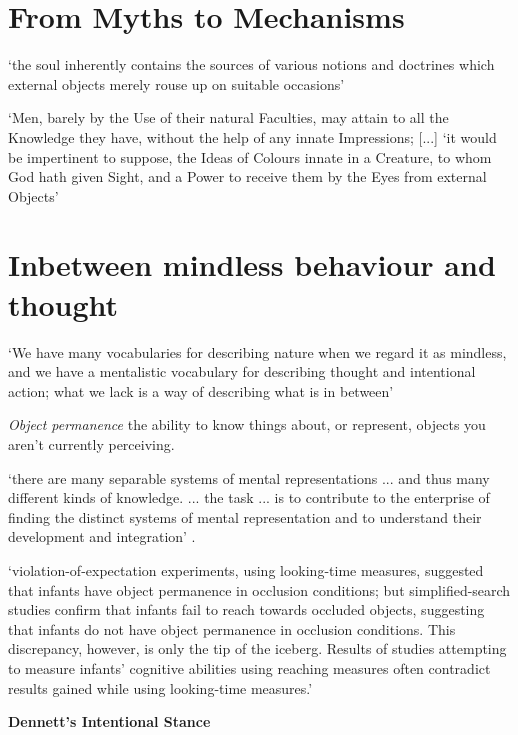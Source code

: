 \documentclass[12pt]{extarticle}
\begin{document}
\begin{multicols}{3}
 
 
\section{From Myths to Mechanisms}
 
‘the soul inherently contains the sources of various notions and doctrines which external objects merely rouse up on suitable occasions’
\citep[p.\ 48]{Leibniz:1996bl}
 
‘Men, barely by the Use of their natural Faculties, may attain to all the Knowledge they have, without the help of any innate Impressions; [...]
‘it would be impertinent to suppose, the Ideas of Colours innate in a Creature, to whom God hath given Sight, and a Power to receive them by the Eyes from external Objects’
\citep[p.\ 48]{Locke:1975qo}
 
 
 
\section{Inbetween mindless behaviour and thought}
 
‘We have many vocabularies for describing nature when we regard it as mindless, and we have a mentalistic vocabulary for describing thought and intentional action; what we lack is a way of describing what is in between’ \citep[p.\ 11]{Davidson:1999ju}
 
\textit{Object permanence}
the ability to know things about, or represent, objects you aren't currently perceiving.
 
‘there are many separable systems of mental representations ... and thus many different kinds of knowledge. ... the task ... is to contribute to the enterprise of finding the distinct systems of mental representation and to understand their development and integration’
\citep[p.\ 1522]{Hood:2000bf}.
 
‘violation-of-expectation experiments, using looking-time measures, suggested that infants have object permanence in occlusion conditions; but simplified-search studies confirm that infants fail to reach towards occluded objects, suggesting that infants do not have object permanence in occlusion conditions. This discrepancy, however, is only the tip of the iceberg. Results of studies attempting to measure infants’ cognitive abilities using reaching measures often contradict results gained while using looking-time measures.’ \citep[p.\ 994]{charles:2009_object}
 
\textbf{Dennett’s Intentional Stance}
 

\end{multicols}
\end{document}
